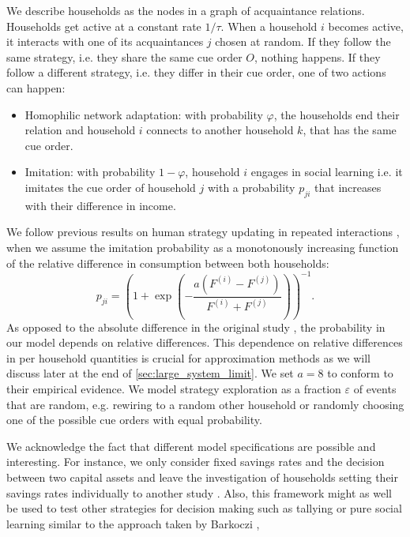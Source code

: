 We describe households as the nodes in a graph of acquaintance relations. Households get active at a constant rate $1/\tau$. When a household $i$ becomes active, it interacts with one of its acquaintances $j$ chosen at random. If they follow the same strategy, i.e. they share the same cue order $O$, nothing happens. If they follow a different strategy, i.e. they differ in their cue order, one of two actions can happen:
\begin{itemize}
	\item Homophilic network adaptation: with probability $\varphi$, the households end their relation and household $i$ connects to another household $k$, that has the same cue order. 
	\item Imitation: with probability $1-\varphi$, household $i$ engages in social learning i.e. it imitates the cue order of household $j$ with a probability $p_{ji}$ that increases with their difference in income.
\end{itemize}
We follow previous results on human strategy updating in repeated interactions \cite{Traulsen2010}, when we assume the imitation probability as a monotonously increasing function of the relative difference in consumption between both households:
\begin{equation}
	p_{ji} =  \left(1 + \exp \left(- \frac{a(F^{(i)} - F^{(j)})}{F^{(i)} + F^{(j)}} \right) \right)^{-1}.
    \label{eq:imitation_probability}
\end{equation}
As opposed to the absolute difference in the original study \cite{Traulsen2010}, the probability in our model depends on relative differences. This dependence on relative differences in per household quantities is crucial for approximation methods as we will discuss later at the end of \ref{sec:large_system_limit}.
We set $a = 8$ to conform to their empirical evidence.
We model strategy exploration as a fraction $\varepsilon$ of events that are random, e.g. rewiring to a random other household or randomly choosing one of the possible cue orders with equal probability.

We acknowledge the fact that different model specifications are possible and interesting.
For instance, we only consider fixed savings rates and the decision between two capital assets and leave the investigation of households setting their savings rates individually to another study \cite{Asano2018}.
Also, this framework might as well be used to test other strategies for decision making such as tallying or pure social learning similar to the approach taken by Barkoczi \cite{Barkoczi2013}, \cite{Barkoczi2016}

